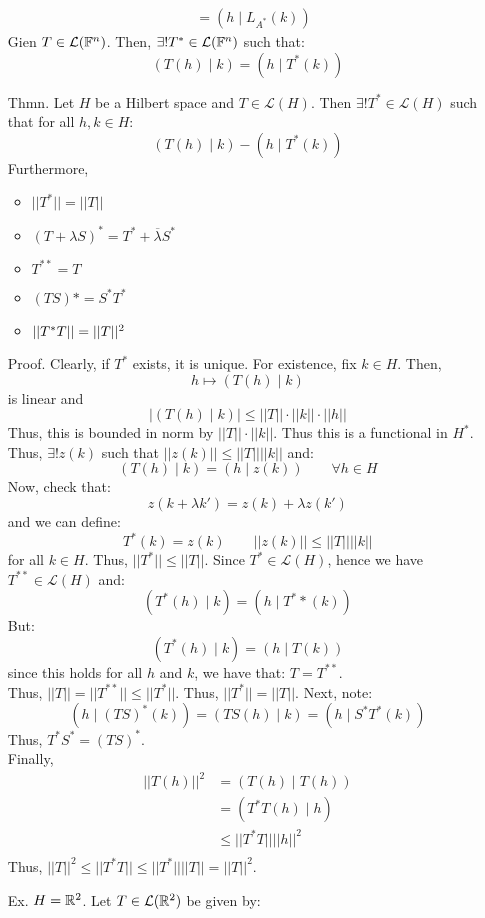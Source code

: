 \documentclass[12pt]{article}
\begin{document}
\begin{itemize}
\begin{align*}
        &= (h \mid L_{A^*}(k))
    \end{align*}
    Gien $T \in \mathcal L(\mathbb F^n)$. Then, $\exists! T^* \in \mathcal L(\mathbb F^n)$ such that:
    \[ (T(h) \mid k) = (h \mid T^*(k))\]
    \item[Thmn.] Let $H$ be a Hilbert space and $T \in \mathcal L(H)$. Then $\exists! T^* \in \mathcal L (H)$ such that for all $h, k \in H$: 
    \[ (T(h) \mid k) - (h \mid T^*(k)) \]
    Furthermore, 
    \begin{itemize}
        \item $||T^*|| = ||T||$
        \item $(T+\lambda S)^* = T^* + \overline{\lambda} S^*$
        \item $T^{**} = T$
        \item $(TS)* = S^*T^*$
        \item $\left\vert\left\vert T^*T\right\vert\right\vert = ||T||^2$
    \end{itemize}
    Proof. Clearly, if $T^*$ exists, it is unique. For existence, fix $k \in H$. Then, 
    \[ h \mapsto (T(h) \mid k)\]
    is linear and 
    \[ |(T(h)\mid k)| \leq ||T|| \cdot ||k|| \cdot ||h||\]
    Thus, this is bounded in norm by $||T|| \cdot ||k||$. Thus this is a functional in $H^*$. Thus, $\exists! z(k)$ such that $||z(k)|| \leq ||T||||k||$ and: 
    \[ (T(h) \mid k) = (h \mid z(k)) \qquad \forall h \in H\]
    Now, check that: 
    \[ z(k+\lambda k') = z(k) + \lambda z(k') \] 
    and we can define: 
    \[ T^*(k) = z(k) \qquad ||z(k)|| \leq ||T||||k||\]
    for all $k \in H$. Thus, $||T^*|| \leq ||T||$. \bbni
    Since $T^* \in \mathcal L (H)$, hence we have $T^{**} \in \mathcal L(H)$ and: 
    \[ (T^*(h) \mid k) = (h \mid T^**(k))\]
    But:
    \[ (T^*(h) \mid k) = (h \mid T(k))\]
    since this holds for all $h$ and $k$, we have that: $T = T^{**}$. \\
    Thus, $||T|| = ||T^{**}|| \leq ||T^*||$. Thus, $||T^*|| = ||T||$. \bbni 
    Next, note: 
    \[ (h \mid (TS)^*(k)) = (TS(h) \mid k) = (h \mid S^*T^*(k)) \]
    Thus, $T^*S^* = (TS)^*$. \\
    Finally, 
    \begin{align*}
        ||T(h)||^2 &= (T(h) \mid T(h))  \\
        &= (T^*T(h) \mid h) \\
        &\leq ||T^*T|| ||h||^2 \\
    \end{align*}
    Thus, $||T||^2 \leq ||T^*T|| \leq ||T^*||||T|| = ||T||^2$. 
    \item[Ex.] $H = \mathbb R^2$. Let $T \in \mathcal{L}(\mathbb R^2)$ be given by: 

\end{itemize}
\end{document}
